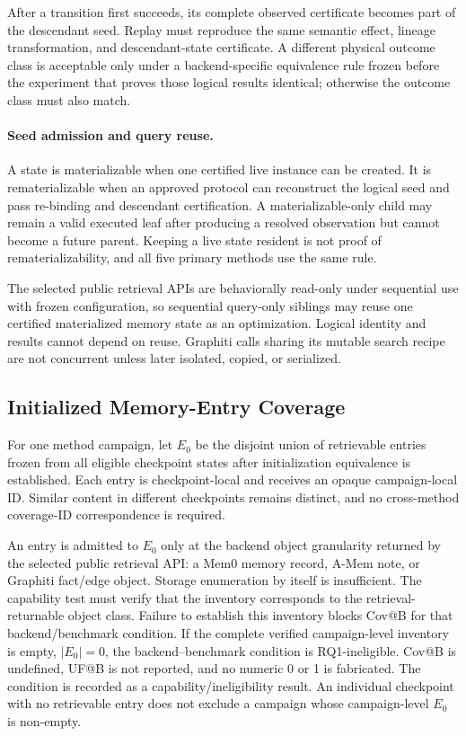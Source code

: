 After a transition first succeeds, its complete observed certificate becomes
part of the descendant seed. Replay must reproduce the same semantic effect,
lineage transformation, and descendant-state certificate. A different physical
outcome class is acceptable only under a backend-specific equivalence rule
frozen before the experiment that proves those logical results identical;
otherwise the outcome class must also match.

\paragraph{Seed admission and query reuse.}
A state is materializable when one certified live instance can be created. It
is rematerializable when an approved protocol can reconstruct the logical seed
and pass re-binding and descendant certification. A materializable-only child
may remain a valid executed leaf after producing a resolved observation but
cannot become a future parent. Keeping a live state resident is not proof of
rematerializability, and all five primary methods use the same rule.

The selected public retrieval APIs are behaviorally read-only under sequential
use with frozen configuration, so sequential query-only siblings may reuse one
certified materialized memory state as an optimization. Logical identity and
results cannot depend on reuse. Graphiti calls sharing its mutable search
recipe are not concurrent unless later isolated, copied, or serialized.

\subsection{Initialized Memory-Entry Coverage}
\label{app:entry-coverage}

For one method campaign, let \(E_0\) be the disjoint union of retrievable
entries frozen from all eligible checkpoint states after initialization
equivalence is established. Each entry is checkpoint-local and receives an
opaque campaign-local ID. Similar content in different checkpoints remains
distinct, and no cross-method coverage-ID correspondence is required.

An entry is admitted to \(E_0\) only at the backend object granularity returned
by the selected public retrieval API: a Mem0 memory record, A-Mem note, or
Graphiti fact/edge object. Storage enumeration by itself is insufficient. The
capability test must verify that the inventory corresponds to the retrieval-
returnable object class. Failure to establish this inventory blocks Cov@B for
that backend/benchmark condition.
If the complete verified campaign-level inventory is empty, \(|E_0|=0\), the
backend--benchmark condition is RQ1-ineligible. Cov@B is undefined, UF@B is not
reported, and no numeric 0 or 1 is fabricated. The condition is recorded as a
capability/ineligibility result. An individual checkpoint with no retrievable
entry does not exclude a campaign whose campaign-level \(E_0\) is non-empty.

